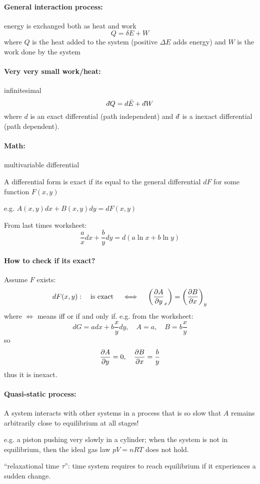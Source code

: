 \documentclass[../main.tex]{subfiles}
\begin{document}
\newpage
{}
\paragraph*{General interaction process:} energy is exchanged both as heat and work
\[Q = \delta E + W\]
where $Q$ is the heat added to the system (positive $\Delta E$ adds energy)
and $W$ is the work done by the system

\paragraph*{Very very small work/heat:} infinitesimal
\[d\hspace*{-0.08em}\bar{}\hspace*{0.1em} Q = d\bar E + d\hspace*{-0.08em}\bar{}\hspace*{0.1em} W\]
where $d$ is an exact differential (path independent) and $d\hspace*{-0.08em}\bar{}\hspace*{0.1em}$ is a inexact differential (path dependent).

\paragraph*{Math:} multivariable differential

A differential form is exact if its equal to the general differential $dF$ for some function $F(x,y)$

e.g. \(A(x,y) dx + B(x,y) dy = dF(x,y)\)

From last times worksheet:
\[\frac{a}{x} dx + \frac{b}{y} dy = d (a \ln x + b \ln y)\]

\paragraph*{How to check if its exact?} Assume $F$ exists:
\[dF(x,y): \qqtext{is exact} \iff \quad \qt(\pdv{A}{y}_x) = \qt(\pdv{B}{x})_y\]
where $\iff$ means iff or if and only if. e.g. from the worksheet:
\[dG = a dx + b \frac{x}{y} dy, \quad A = a, \quad B = b\frac{x}{y} \]
so
\[\pdv{A}{y} = 0, \quad \pdv{B}{x} = \frac{b}{y}\]
thus it is inexact.

\paragraph{Quasi-static process:} A system interacts with other systems in a process that is so slow that $A$ remains arbitrarily close to equilibrium at all stages!

e.g. a piston pushing very slowly in a cylinder; when the system is not in equilibrium, then the ideal gas law $pV = nRT$ does not hold.

``relaxational time $\tau$'': time system requires to reach equilibrium if it experiences a sudden change.
\end{document}
